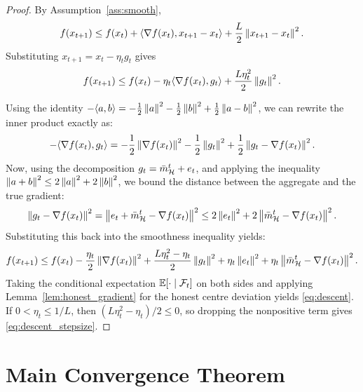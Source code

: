 \begin{proof}
By Assumption~\ref{ass:smooth},
\[
    f(x_{t+1})
    \le
    f(x_t)
    +
    \langle \nabla f(x_t), x_{t+1}-x_t \rangle
    +
    \frac{L}{2}\left\lVert x_{t+1}-x_t \right\rVert^2.
\]
Substituting \(x_{t+1}=x_t-\eta_t g_t\) gives
\[
    f(x_{t+1})
    \le
    f(x_t)
    -
    \eta_t \langle \nabla f(x_t), g_t \rangle
    +
    \frac{L\eta_t^2}{2}\left\lVert g_t \right\rVert^2.
\]

Using the identity \(-\langle a, b \rangle = -\frac{1}{2}\left\lVert a \right\rVert^2 - \frac{1}{2}\left\lVert b \right\rVert^2 + \frac{1}{2}\left\lVert a-b \right\rVert^2\), we can rewrite the inner product exactly as:
\[
    -\langle \nabla f(x_t), g_t \rangle
    =
    -\frac{1}{2}\left\lVert \nabla f(x_t) \right\rVert^2
    - \frac{1}{2}\left\lVert g_t \right\rVert^2
    + \frac{1}{2}\left\lVert g_t - \nabla f(x_t) \right\rVert^2.
\]
Now, using the decomposition \(g_t = \bar m_{\mathcal{H}}^t + e_t\), and applying the inequality \(\left\lVert a+b \right\rVert^2 \le 2\left\lVert a \right\rVert^2 + 2\left\lVert b \right\rVert^2\), we bound the distance between the aggregate and the true gradient:
\[
    \left\lVert g_t - \nabla f(x_t) \right\rVert^2
    =
    \left\lVert e_t + \bar m_{\mathcal{H}}^t - \nabla f(x_t) \right\rVert^2
    \le
    2\left\lVert e_t \right\rVert^2 + 2\left\lVert \bar m_{\mathcal{H}}^t - \nabla f(x_t) \right\rVert^2.
\]
Substituting this back into the smoothness inequality yields:
\[
    f(x_{t+1})
    \le
    f(x_t)
    - \frac{\eta_t}{2}\left\lVert \nabla f(x_t) \right\rVert^2
    +
    \frac{L\eta_t^2-\eta_t}{2}\left\lVert g_t \right\rVert^2
    + \eta_t\left\lVert e_t \right\rVert^2
    + \eta_t\left\lVert \bar m_{\mathcal{H}}^t - \nabla f(x_t) \right\rVert^2.
\]
Taking the conditional expectation \(\mathbb{E}[\cdot \mid \mathcal{F}_t]\) on both sides and applying Lemma~\ref{lem:honest_gradient} for the honest centre deviation yields \eqref{eq:descent}. If \(0<\eta_t\le1/L\), then \((L\eta_t^2-\eta_t)/2\le0\), so dropping the nonpositive term gives \eqref{eq:descent_stepsize}.
\end{proof}

\section{Main Convergence Theorem}

